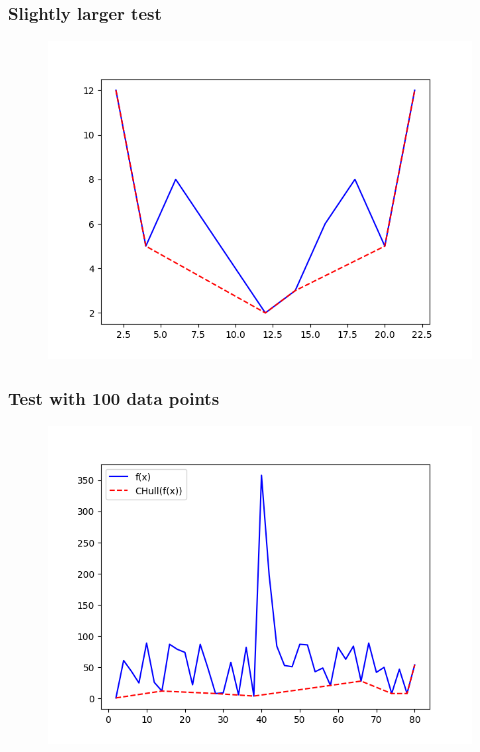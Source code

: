\documentclass{beamer}
\begin{document}
\begin{frame}
\frametitle{Slightly larger test}
	\begin{figure}
		\center
		\includegraphics[scale=0.6]{../Figures/Figure_1.png}
	\end{figure}
\end{frame}

\begin{frame}
\frametitle{Test with 100 data points}
	\begin{figure}
		\center
		\includegraphics[scale=0.6]{../Figures/Figure_4.png}
	\end{figure}
\end{frame}
\end{document}
